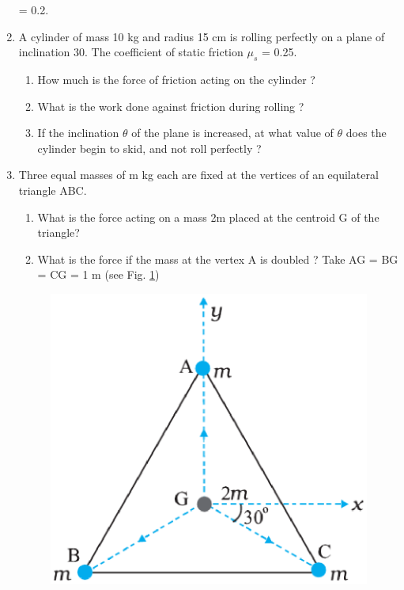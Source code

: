 \begin{enumerate}[label=\arabic*.,ref=\thesubsection.\theenumi]
= 0.2.
\item  A cylinder of mass 10 kg and radius 15 cm is rolling perfectly on a plane of inclination 30\degree. The coefficient of static friction $\mu_s$ = 0.25. 
\begin{enumerate}[label=(\alph*)]
\item  How much is the force of friction acting on the cylinder ? 
\item  What is the work done against friction during rolling ? 
\item  If the inclination $\theta$ of the plane is increased, at what value of $\theta$ does the cylinder begin to skid, and not roll perfectly ?
\end{enumerate}
\item Three equal masses of m kg each are fixed at the vertices of an
equilateral triangle ABC. 
\begin{enumerate}[label=(\alph*)]
\item  What is the force acting on a mass 2m placed at the centroid G of the triangle? 
\item  What is the force if the mass at the vertex A is doubled ? Take AG = BG = CG = 1 m (see Fig. \ref{fig:8.5})
\end{enumerate}
\begin{figure}[!ht]
\includegraphics[width=\columnwidth]{./figs/11-1/8/8.5.eps}
\caption{}
\label{fig:8.5}
\end{figure}

\end{enumerate}
